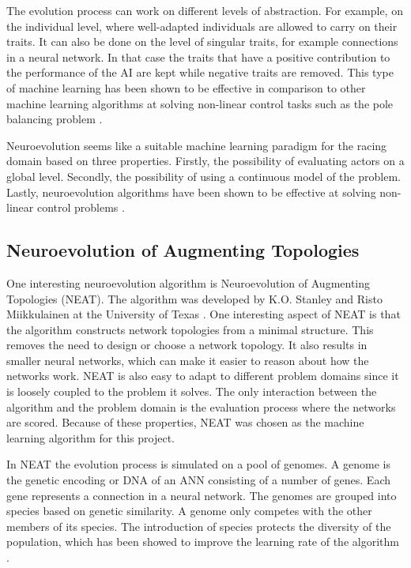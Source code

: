 The evolution process can work on different levels of abstraction. For example, on the individual level, where well-adapted individuals are allowed to carry on their traits. It can also be done on the level of singular traits, for example connections in a neural network. In that case the traits that have a positive contribution to the performance of the AI are kept while negative traits are removed. This type of machine learning has been shown to be effective in comparison to other machine learning algorithms at solving non-linear control tasks such as the pole balancing problem \cite{gomez:efficient_nonlinear_control}.

Neuroevolution seems like a suitable machine learning paradigm for the racing domain based on three properties. Firstly, the possibility of evaluating actors on a global level. Secondly, the possibility of using a continuous model of the problem. Lastly, neuroevolution algorithms have been shown to be effective at solving non-linear control problems \cite{gomez:efficient_nonlinear_control}. 


\subsection{Neuroevolution of Augmenting Topologies} 
\label{theory:neat}

One interesting neuroevolution algorithm is Neuroevolution of Augmenting Topologies (NEAT). The algorithm was developed by K.O. Stanley and Risto Miikkulainen at the University of Texas \cite{stanley:neat}. One interesting aspect of NEAT is that the algorithm constructs network topologies from a minimal structure. This removes the need to design or choose a network topology. It also results in smaller neural networks, which can make it easier to reason about how the networks work. NEAT is also easy to adapt to different problem domains since it is loosely coupled to the problem it solves. The only interaction between the algorithm and the problem domain is the evaluation process where the networks are scored. Because of these properties, NEAT was chosen as the machine learning algorithm for this project. 

In NEAT the evolution process is simulated on a pool of genomes. A genome is the genetic encoding or DNA of an ANN consisting of a number of genes. Each gene represents a connection in a neural network. The genomes are grouped into species based on genetic similarity. A genome only competes with the other members of its species. The introduction of species protects the diversity of the population, which has been showed to improve the learning rate of the algorithm \cite{stanley:neat}.  

